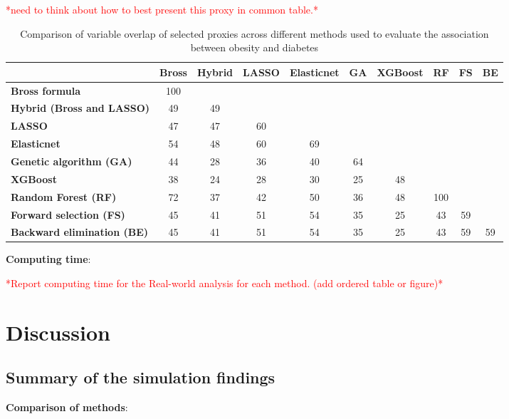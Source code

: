 \documentclass[sn-vancouver,Numbered,lineno,pdflatex]{sn-jnl}
\begin{document}
\textcolor{red}{*need to think about how to best present this proxy in common table.*}

\begin{table}[htbp]
\centering
\caption{Comparison of variable overlap of selected proxies across different methods used to evaluate the association between obesity and diabetes}
\label{tab:method-comparison}
\begin{tabular}{lccccccccc}
\toprule
 & \textbf{Bross} & \textbf{Hybrid} & \textbf{LASSO} & \textbf{Elasticnet} & \textbf{GA} & \textbf{XGBoost} & \textbf{RF} & \textbf{FS} & \textbf{BE} \\
\midrule
\textbf{Bross formula} & 100 & & & & & & & & \\
\textbf{Hybrid (Bross and LASSO)} & 49 & 49 & & & & & & & \\
\textbf{LASSO} & 47 & 47 & 60 & & & & & & \\
\textbf{Elasticnet} & 54 & 48 & 60 & 69 & & & & & \\
\textbf{Genetic algorithm (GA)} & 44 & 28 & 36 & 40 & 64 & & & & \\
\textbf{XGBoost} & 38 & 24 & 28 & 30 & 25 & 48 & & & \\
\textbf{Random Forest (RF)} & 72 & 37 & 42 & 50 & 36 & 48 & 100 & & \\
\textbf{Forward selection (FS)} & 45 & 41 & 51 & 54 & 35 & 25 & 43 & 59 & \\
\textbf{Backward elimination (BE)} & 45 & 41 & 51 & 54 & 35 & 25 & 43 & 59 & 59 \\
\bottomrule
\end{tabular}
\end{table}

\textbf{Computing time}:

\textcolor{red}{*Report computing time for the Real-world analysis for each method. (add ordered table or figure)*}

\section{Discussion}\label{discussion}

\subsection{Summary of the simulation
findings}\label{summary-of-the-simulation-findings}

\textbf{Comparison of methods}:
\end{document}
